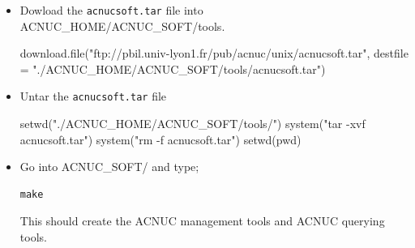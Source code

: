 \documentclass{article}
\begin{document}
\begin{itemize}
\item Dowload the \texttt{acnucsoft.tar} file into ACNUC\_HOME/ACNUC\_SOFT/tools.

\begin{Schunk}
\begin{Sinput}
 download.file("ftp://pbil.univ-lyon1.fr/pub/acnuc/unix/acnucsoft.tar", 
     destfile = "./ACNUC_HOME/ACNUC_SOFT/tools/acnucsoft.tar")
\end{Sinput}
\end{Schunk}


\item Untar the \texttt{acnucsoft.tar} file 

\begin{Schunk}
\begin{Sinput}
 setwd("./ACNUC_HOME/ACNUC_SOFT/tools/")
 system("tar -xvf acnucsoft.tar")
 system("rm -f acnucsoft.tar")
 setwd(pwd)
\end{Sinput}
\end{Schunk}




\item Go into ACNUC\_SOFT/ and type;
\begin{verbatim}
make
\end{verbatim}
This should create the ACNUC management tools and ACNUC querying tools.


\end{itemize}
\end{document}
